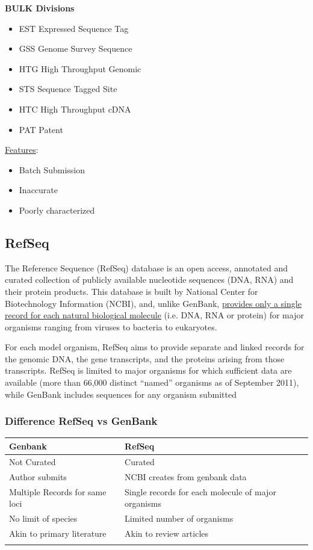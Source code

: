 \documentclass[11pt]{article}
\begin{document}
\textbf{BULK Divisions}\\
\begin{itemize}
\item EST Expressed Sequence Tag
\item GSS Genome Survey Sequence
\item HTG High Throughput Genomic
\item STS Sequence Tagged Site
\item HTC High Throughput cDNA
\item PAT Patent
\end{itemize}

\uline{Features}:
\begin{itemize}
\item Batch Submission
\item Inaccurate
\item Poorly characterized
\end{itemize}


\subsection{RefSeq}
\label{sec:org8733820}
The Reference Sequence (RefSeq) database is an open access, annotated and curated
collection of publicly available nucleotide sequences (DNA, RNA) and their protein products.
This database is built by National Center for Biotechnology Information (NCBI), and, unlike
GenBank, \uline{provides only a single record for each natural biological molecule} (i.e. DNA, RNA or
protein) for major organisms ranging from viruses to bacteria to eukaryotes.

For each model organism, RefSeq aims to provide separate and linked records for the genomic
DNA, the gene transcripts, and the proteins arising from those transcripts. RefSeq is limited
to major organisms for which sufficient data are available (more than 66,000 distinct “named”
organisms as of September 2011), while GenBank includes sequences for any organism
submitted

\subsubsection{Difference RefSeq vs GenBank}
\label{sec:orgce64ade}


\begin{center}
\begin{tabular}{ll}
Genbank & RefSeq\\
\hline
Not Curated & Curated\\
Author submits & NCBI creates from genbank data\\
Multiple Records for same loci & Single records for each molecule of major organisms\\
No limit of species & Limited number of organisms\\
Akin to primary literature & Akin to review articles\\
 & \\
\end{tabular}
\end{center}
\end{document}
